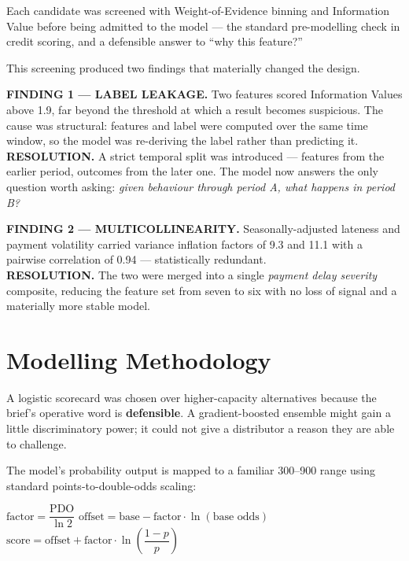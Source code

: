 \documentclass[11pt,a4paper]{article}
\newcommand{\lab}[1]{{\color{navy}\bfseries\footnotesize #1}}
\begin{document}
Each candidate was screened with Weight-of-Evidence binning and Information
Value before being admitted to the model --- the standard pre-modelling check in
credit scoring, and a defensible answer to ``why this feature?''

This screening produced two findings that materially changed the design.

\begin{callout}
\lab{FINDING 1 --- LABEL LEAKAGE.} Two features scored Information Values above
1.9, far beyond the threshold at which a result becomes suspicious. The cause
was structural: features and label were computed over the same time window, so
the model was re-deriving the label rather than predicting it. \\[3pt]
\lab{RESOLUTION.} A strict temporal split was introduced --- features from the
earlier period, outcomes from the later one. The model now answers the only
question worth asking: \emph{given behaviour through period A, what happens in
period B?}
\end{callout}

\begin{callout}
\lab{FINDING 2 --- MULTICOLLINEARITY.} Seasonally-adjusted lateness and payment
volatility carried variance inflation factors of 9.3 and 11.1 with a pairwise
correlation of 0.94 --- statistically redundant. \\[3pt]
\lab{RESOLUTION.} The two were merged into a single \emph{payment delay
severity} composite, reducing the feature set from seven to six with no loss of
signal and a materially more stable model.
\end{callout}

\section{Modelling Methodology}

A logistic scorecard was chosen over higher-capacity alternatives because the
brief's operative word is \textbf{defensible}. A gradient-boosted ensemble might
gain a little discriminatory power; it could not give a distributor a reason
they are able to challenge.

The model's probability output is mapped to a familiar 300--900 range using
standard points-to-double-odds scaling:

\vspace{-4pt}
\begin{center}
\small
$\text{factor} = \dfrac{\text{PDO}}{\ln 2}$ \qquad
$\text{offset} = \text{base} - \text{factor}\cdot\ln(\text{base odds})$ \qquad
$\text{score} = \text{offset} + \text{factor}\cdot\ln\!\left(\dfrac{1-p}{p}\right)$
\end{center}
\end{document}
